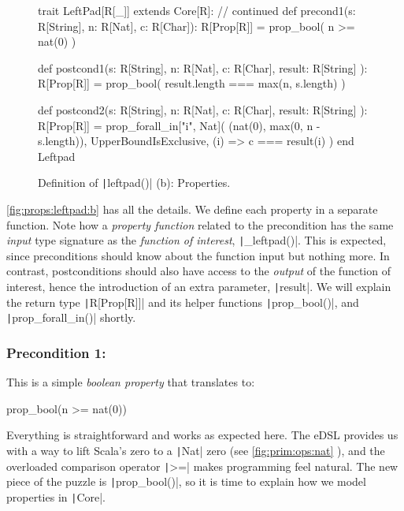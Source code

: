 \documentclass[11pt]{article}
\renewcommand{\vref}[1]{\autoref{#1} \vpageref{#1}}{}
\newcommand{\ScalaI}[1]{\texttt|#1|}
\begin{document}
\begin{figure}[tb]
\begin{ScalaBlock}
trait LeftPad[R[_]] extends Core[R]:
  // continued
  def precond1(s: R[String], n: R[Nat], c: R[Char]): R[Prop[R]] =
    prop_bool( n >= nat(0) )
  
  def postcond1(s: R[String], n: R[Nat], c: R[Char],
    result: R[String]
  ): R[Prop[R]] =
    prop_bool( result.length === max(n, s.length) )
  
  def postcond2(s: R[String], n: R[Nat], c: R[Char],
    result: R[String]
  ): R[Prop[R]] =
    prop_forall_in["i", Nat](
      (nat(0), max(0, n - s.length)),
      UpperBoundIsExclusive,
      (i) => c === result(i)
    )
end Leftpad
\end{ScalaBlock}
\caption{Definition of \ScalaI{leftpad()} (b): Properties.}
\label{fig:props:leftpad:b}
\hrulefill
\end{figure}


\vref{fig:props:leftpad:b} has all the details. We define each property in a 
separate function. Note how a \textit{property function} related to the 
precondition has the same \textit{input} type signature as the 
\textit{function of interest}, \ScalaI{_leftpad()}. This is expected, since 
preconditions should know about the function input but nothing more. In 
contrast, postconditions should also have access to the \textit{output} of 
the function of interest, hence the introduction of an extra parameter, 
\ScalaI{result}. We will explain the return type \ScalaI{R[Prop[R]]} and its 
helper functions \ScalaI{prop_bool()}, and \ScalaI{prop_forall_in()} shortly.

\subsubsection*{Precondition 1: \leftpadprea}
\noindent This is a simple \textit{boolean property} that translates to:

\begin{ScalaBlockSimple}
prop_bool(n >= nat(0))
\end{ScalaBlockSimple}

\noindent Everything is straightforward and works as expected here. The eDSL 
provides us with a way to lift Scala's zero to a \ScalaI{Nat} zero (see 
\vref{fig:prim:ops:nat}), and the overloaded comparison operator \ScalaI{>=} 
makes programming feel natural. The new piece of the puzzle is 
\ScalaI{prop_bool()}, so it is time to explain how we model properties in 
\ScalaI{Core}.
\end{document}
